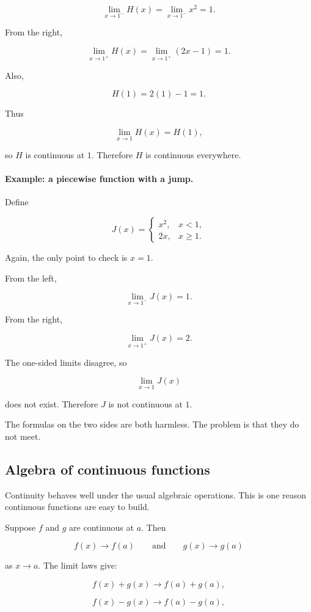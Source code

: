\[
\lim_{x\to1^-}H(x)=\lim_{x\to1^-}x^2=1.
\]

From the right,

\[
\lim_{x\to1^+}H(x)=\lim_{x\to1^+}(2x-1)=1.
\]

Also,

\[
H(1)=2(1)-1=1.
\]

Thus

\[
\lim_{x\to1}H(x)=H(1),
\]

so \(H\) is continuous at \(1\).  Therefore \(H\) is continuous everywhere.

\paragraph{Example: a piecewise function with a jump.}
Define

\[
J(x)=
\begin{cases}
x^2, & x<1,\\
2x, & x\ge1.
\end{cases}
\]

Again, the only point to check is \(x=1\).

From the left,

\[
\lim_{x\to1^-}J(x)=1.
\]

From the right,

\[
\lim_{x\to1^+}J(x)=2.
\]

The one-sided limits disagree, so

\[
\lim_{x\to1}J(x)
\]

does not exist.  Therefore \(J\) is not continuous at \(1\).

The formulas on the two sides are both harmless.  The problem is that they do not meet.

\subsection{Algebra of continuous functions}
\label{subsec:algebra-continuous-functions}

Continuity behaves well under the usual algebraic operations.  This is one reason continuous functions are easy to build.

Suppose \(f\) and \(g\) are continuous at \(a\).  Then

\[
f(x)\to f(a)
\qquad\text{and}\qquad
g(x)\to g(a)
\]

as \(x\to a\).  The limit laws give:

\[
f(x)+g(x)\to f(a)+g(a),
\]

\[
f(x)-g(x)\to f(a)-g(a),
\]

